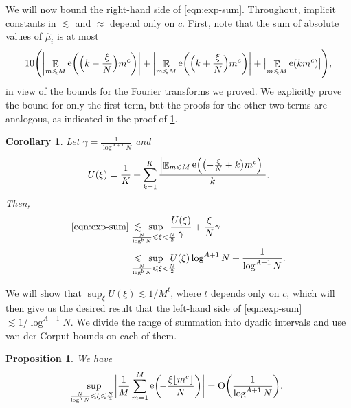 \documentclass[letterpaper, 12pt]{article}
\theoremstyle{plain}
\newtheorem{Proposition}[Theorem]{Proposition}
\newtheorem{Corollary}[Theorem]{Corollary}
\theoremstyle{definition}
\theoremstyle{plain}
\theoremstyle{plain}
\numberwithin{equation}{section}
\newcommand{\Oh}{{\rm O}}
\renewcommand{\leq}{\leqslant}
\newcommand{\E}{\mathbb{E}}
\newcommand{\1}{\textbf{1}}
\DeclarePairedDelimiter\floor{\lfloor}{\rfloor}
\DeclareMathOperator{\e}{e}
\begin{document}
We will now bound the right-hand side of \cref{eqn:exp-sum}. Throughout, implicit constants in $\lesssim$ and $\approx$ depend only on $c$. First, note that the sum of absolute values of $\hat{\mu}_i$ is at most
\begin{equation*}
    10 \Biggl( \biggl\lvert \mathop{\E}_{m \leq M} \e\biggl( \Bigl(k - \frac{\xi}{N} \Bigr) m^c \biggr) \biggr\rvert 
    + \biggl\lvert \mathop{\E}_{m \leq M} \e\biggl( \Bigl(k + \frac{\xi}{N} \Bigr) m^c \biggr) \biggr\rvert 
    + \bigl\lvert \mathop{\E}_{m \leq M} \e(km^c) \bigr\rvert \Biggr),
\end{equation*}
in view of the bounds for the Fourier transforms we proved. We explicitly prove the bound for only the first term, but the proofs for the other two terms are analogous, as indicated in the proof of \cref{prop:estimate-sigma2-details}.

\begin{Corollary}\label{cor:bound-for-turan-bound}
    Let $\gamma = \frac{1}{\log^{A + 1} N}$ and
    \[
        U(\xi) = \frac{1}{K} + \sum_{k = 1}^{K} \frac{\Bigl\lvert \mathop{\E}_{m \leq M} \e\Bigl(\bigl(-\frac{\xi}{N} + k\bigr) m^c \Bigr) \Bigr\rvert}{k}.
    \]
    Then, 
    \begin{align*}
        \eqref{eqn:exp-sum}\; &\lesssim \;\,\smashoperator{\sup_{\mkern-10mu \frac{N}{\log^b N} \leq \xi < \frac{N}{2}}}\;\; \frac{U(\xi)}{\gamma} + \frac{\xi}{N} \gamma\\ 
        &\leq \;\,\smashoperator{\sup_{\mkern-10mu \frac{N}{\log^b{N}} \leq \xi < \frac{N}{2}}}\;\; U(\xi) \log^{A+1} N + \frac{1}{\log^{A + 1} N}.
    \end{align*}
\end{Corollary}

We will show that $\sup_{\xi} U(\xi) \lesssim 1/M^{t}$, where $t$ depends only on $c$, which will then give us the desired result that the left-hand side of \cref{eqn:exp-sum} $\lesssim 1/\log^{A + 1} N$. We divide the range of summation into dyadic intervals and use van der Corput bounds on each of them.

\begin{Proposition}\label{prop:estimate-sigma2-details}
    We have
    \[
        \sup_{\mkern-10mu \frac{N}{\log^b N} \leq \xi \leq \frac{N}{2}}
        \biggl\lvert \frac{1}{M} \sum_{m=1}^M \e\biggl(\!-\frac{\xi \floor{m^c}}{N} \biggr)\biggr\rvert 
        = \Oh\biggl(\frac{1}{\log^{A+1} N}\biggr).
    \]
\end{Proposition}
\end{document}
